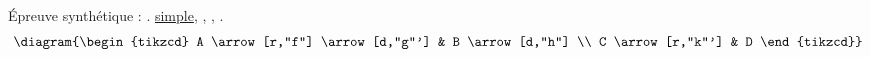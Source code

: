 Épreuve synthétique : .
\uline{simple}, , , .
\[
  \diagram{\begin{tikzcd}
    A \arrow[r,"f"] \arrow[d,"g"'] & B \arrow[d,"h"] \\
    C \arrow[r,"k"'] & D
  \end{tikzcd}}
\]


